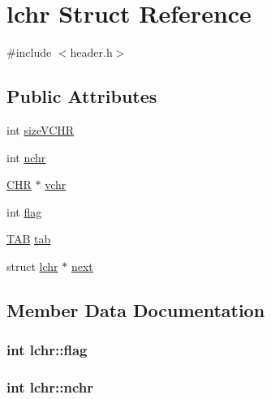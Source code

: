 \hypertarget{structlchr}{}\section{lchr Struct Reference}
\label{structlchr}


{\ttfamily \#include $<$header.\+h$>$}

\subsection*{Public Attributes}
\begin{DoxyCompactItemize}
\item 
int \hyperlink{structlchr_adfe0095d4e23d67ecbc070b08847134f}{size\+V\+C\+H\+R}
\item 
int \hyperlink{structlchr_ae552df45d3a8c49a1945b1cec21ea6f7}{nchr}
\item 
\hyperlink{header_8h_aae09bd966f506bbc749b3c5fdea8d2b8}{C\+H\+R} $\ast$ \hyperlink{structlchr_aeebc6baee26889679cfb6db05f8f1c00}{vchr}
\item 
int \hyperlink{structlchr_a9aef3b5d61a0d98f706519d1317a2bde}{flag}
\item 
\hyperlink{header_8h_a82b1e990787e6069a9af95c65a082b67}{T\+A\+B} \hyperlink{structlchr_a7a7d388281d331e5edc210408c120f7d}{tab}
\item 
struct \hyperlink{structlchr}{lchr} $\ast$ \hyperlink{structlchr_a199de28f3696502a144d0700a71079af}{next}
\end{DoxyCompactItemize}


\subsection{Member Data Documentation}
\hypertarget{structlchr_a9aef3b5d61a0d98f706519d1317a2bde}{}
\subsubsection[{flag}]{\setlength{\rightskip}{0pt plus 5cm}int lchr\+::flag}\label{structlchr_a9aef3b5d61a0d98f706519d1317a2bde}
\hypertarget{structlchr_ae552df45d3a8c49a1945b1cec21ea6f7}{}
\subsubsection[{nchr}]{\setlength{\rightskip}{0pt plus 5cm}int lchr\+::nchr}\label{structlchr_ae552df45d3a8c49a1945b1cec21ea6f7}
\hypertarget{structlchr_a199de28f3696502a144d0700a71079af}{}
